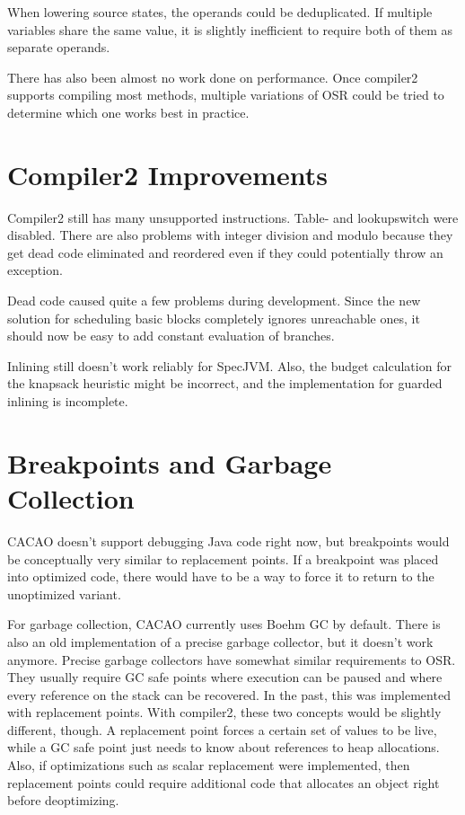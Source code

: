 \documentclass[draft,final]{vutinfth} %
\begin{document}
    When lowering source states, the operands could be deduplicated.
    If multiple variables share the same value, it is slightly inefficient
    to require both of them as separate operands.

    There has also been almost no work done on performance.
    Once compiler2 supports compiling most methods,
    multiple variations of OSR could be tried to
    determine which one works best in practice.


    \section{Compiler2 Improvements}

    Compiler2 still has many unsupported instructions.
    Table- and lookupswitch were disabled.
    There are also problems with integer division and modulo
    because they get dead code eliminated and reordered
    even if they could potentially throw an exception.

    Dead code caused quite a few problems during development.
    Since the new solution for scheduling basic blocks completely
    ignores unreachable ones, it should now be easy to add
    constant evaluation of branches.

    Inlining still doesn't work reliably for SpecJVM.
    Also, the budget calculation for the knapsack heuristic might be incorrect,
    and the implementation for guarded inlining is incomplete.


    \section{Breakpoints and Garbage Collection}

    CACAO doesn't support debugging Java code right now,
    but breakpoints would be conceptually very similar to replacement points.
    If a breakpoint was placed into optimized code,
    there would have to be a way to force it to return to the unoptimized variant.

    For garbage collection,
    CACAO currently uses Boehm GC by default.
    There is also an old implementation of a precise garbage collector, but it doesn't work anymore.
    Precise garbage collectors have somewhat similar requirements to OSR.
    They usually require GC safe points where execution can be paused
    and where every reference on the stack can be recovered.
    In the past, this was implemented with replacement points.
    With compiler2, these two concepts would be slightly different, though.
    A replacement point forces a certain set of values to be live,
    while a GC safe point just needs to know about references to heap allocations.
    Also, if optimizations such as scalar replacement were implemented,
    then replacement points could require additional code
    that allocates an object right before deoptimizing.
\end{document}
